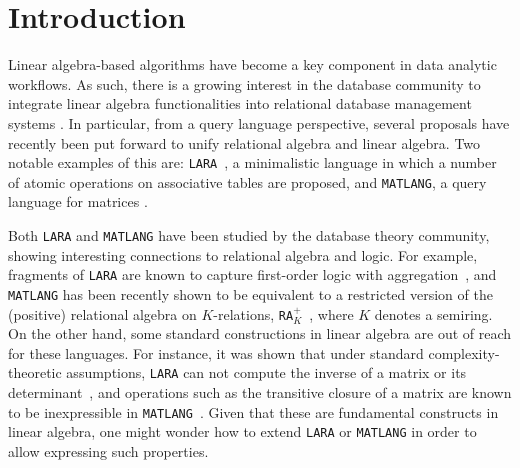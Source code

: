 \documentclass[sigconf]{acmart}
\newcommand{\rak}{\texttt{RA}$_K^+$\xspace}
\newcommand{\lara}{\texttt{LARA}\xspace}
\newcommand{\lang}{\texttt{MATLANG}\xspace}
\begin{document}
\maketitle

\section{Introduction}
Linear algebra-based algorithms have become a key component in data analytic workflows. As such, there is a growing interest in the database community to integrate linear algebra functionalities into relational database management systems \cite{Jermaine/17/LAonRA,2019Boehm,LARA_Berlin_2016,JankovLYCZJG19,Khamis0NOS18}. In particular, from a query language perspective, several proposals have recently been put forward to unify relational algebra and linear algebra. Two notable examples of this are: \lara~\cite{HutchisonHS17}, a minimalistic language in which a number of atomic operations on 
associative tables are proposed, and \lang, a query language for 
matrices \cite{matlang,matlang-journal}.

Both \lara and \lang have been studied by the database theory community, showing interesting connections to relational algebra and logic. For example, fragments of \lara are known to capture first-order logic with aggregation~\cite{BarceloH0S20}, and \lang has been recently shown to be equivalent to a restricted version of the (positive) relational algebra on $K$-relations, \rak~\cite{brijder2019matrices}, where $K$ denotes a semiring. On the other hand, 
some standard constructions in linear algebra 
are out of reach for these languages. For instance, it was shown that under standard complexity-theoretic assumptions, \lara can not compute the inverse of a matrix or its determinant~\cite{BarceloH0S20}, and operations such as the transitive closure of a matrix are known to be inexpressible in \lang~\cite{matlang-journal}. Given that these are fundamental constructs in linear algebra, one might wonder how to extend \lara or \lang in order to allow expressing such properties.
\end{document}
